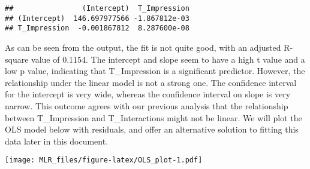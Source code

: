 \documentclass[
]{article}
\newenvironment{Shaded}{\begin{snugshade}}{\end{snugshade}}
\newcommand{\CommentTok}[1]{\textcolor[rgb]{0.56,0.35,0.01}{\textit{#1}}}
\newcommand{\DataTypeTok}[1]{\textcolor[rgb]{0.13,0.29,0.53}{#1}}
\newcommand{\DecValTok}[1]{\textcolor[rgb]{0.00,0.00,0.81}{#1}}
\newcommand{\FloatTok}[1]{\textcolor[rgb]{0.00,0.00,0.81}{#1}}
\newcommand{\KeywordTok}[1]{\textcolor[rgb]{0.13,0.29,0.53}{\textbf{#1}}}
\newcommand{\NormalTok}[1]{#1}
\newcommand{\OperatorTok}[1]{\textcolor[rgb]{0.81,0.36,0.00}{\textbf{#1}}}
\newcommand{\StringTok}[1]{\textcolor[rgb]{0.31,0.60,0.02}{#1}}
\begin{document}
\begin{verbatim}
##                (Intercept)  T_Impression
## (Intercept)  146.697977566 -1.867812e-03
## T_Impression  -0.001867812  8.287600e-08
\end{verbatim}

As can be seen from the output, the fit is not quite good, with an
adjusted R-square value of 0.1154. The intercept and slope seem to have
a high t value and a low p value, indicating that T\_Impression is a
significant predictor. However, the relationship under the linear model
is not a strong one. The confidence interval for the intercept is very
wide, whereas the confidence interval on slope is very narrow. This
outcome agrees with our previous analysis that the relationship between
T\_Impression and T\_Interactions might not be linear. We will plot the
OLS model below with residuals, and offer an alternative solution to
fitting this data later in this document.

\begin{Shaded}
\end{Shaded}

\texttt{[image: MLR\_files/figure-latex/OLS\_plot-1.pdf]}

\begin{Shaded}
\end{Shaded}
\end{document}
